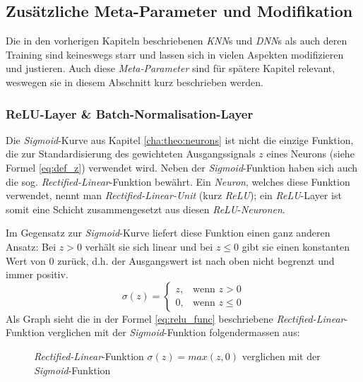 \subsection{Zusätzliche Meta-Parameter und Modifikation}\label{cha:theo:mod}
Die in den vorherigen Kapiteln beschriebenen \textit{KNN}s und \textit{DNN}s als auch deren Training sind keineswegs starr und lassen sich in vielen Aspekten modifizieren und justieren. Auch diese \textit{Meta-Parameter} sind für spätere Kapitel relevant, weswegen sie in diesem Abschnitt kurz beschrieben werden. 

\subsubsection{ReLU-Layer \& Batch-Normalisation-Layer}\label{cha:theo:relu}
Die \textit{Sigmoid}-Kurve aus Kapitel \ref{cha:theo:neurons} ist nicht die einzige Funktion, die zur Standardisierung des gewichteten Ausgangssignals $z$ eines Neurons (siehe Formel \ref{eq:def_z}) verwendet wird. Neben der \textit{Sigmoid}-Funktion haben sich auch die sog. \textit{Rectified-Linear}-Funktion bewährt. Ein \textit{Neuron}, welches diese Funktion verwendet, nennt man \textit{Rectified-Linear-Unit} (kurz \textit{ReLU}); ein \textit{ReLU}-Layer ist somit eine Schicht zusammengesetzt aus diesen \textit{ReLU}-\textit{Neuronen}.

Im Gegensatz zur \textit{Sigmoid}-Kurve liefert diese Funktion einen ganz anderen Ansatz: Bei $z > 0$ verhält sie sich linear und bei $z \leq 0$ gibt sie einen konstanten Wert von 0 zurück, d.h. der Ausgangswert ist nach oben nicht begrenzt und immer positiv.
\begin{equation}\label{eq:relu_func}
	\sigma(z) = \begin{cases} z, & \mbox{wenn } z > 0 \\ 0, & \mbox{wenn } z \leq 0 \end{cases}
\end{equation}
Als Graph sieht die in der Formel \ref{eq:relu_func} beschriebene \textit{Rectified-Linear}-Funktion verglichen mit der \textit{Sigmoid}-Funktion folgendermassen aus:

\begin{figure}[h]
	\centering
	\caption[\textit{Rectified-Linear}-Funktion]{\textit{Rectified-Linear}-Funktion $\sigma(z) = max(z,0)$ verglichen mit der \textit{Sigmoid}-Funktion}
	\label{plt:rect_lin}
\end{figure}

